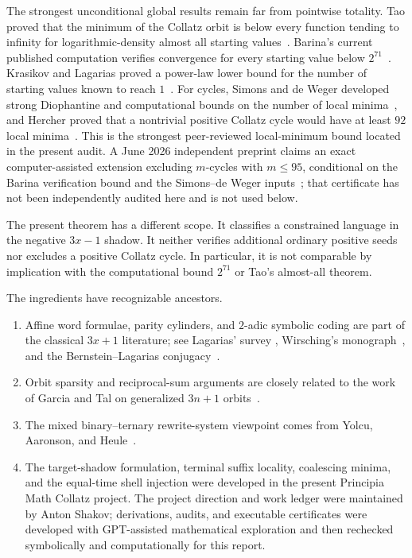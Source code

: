 \documentclass[11pt]{article}
\theoremstyle{definition}
\theoremstyle{remark}
\begin{document}
The strongest unconditional global results remain far from pointwise
totality.  Tao proved that the minimum of the Collatz orbit is below every
function tending to infinity for logarithmic-density almost all starting
values~\cite{Tao2022}.  Barina's current published computation verifies
convergence for every starting value below $2^{71}$~\cite{Barina2025}.
Krasikov and Lagarias proved a power-law lower bound for the number of
starting values known to reach $1$~\cite{KrasikovLagarias2003}.  For cycles,
Simons and de Weger developed strong Diophantine and computational bounds
on the number of local minima~\cite{SimonsDeWeger2005}, and Hercher proved
that a nontrivial positive Collatz cycle would have at least $92$ local
minima~\cite{Hercher2023}.  This is the strongest peer-reviewed local-minimum
bound located in the present audit.  A June 2026 independent preprint claims
an exact computer-assisted extension excluding $m$-cycles with $m\le95$,
conditional on the Barina verification bound and the Simons--de Weger
inputs~\cite{Wang2026}; that certificate has not been independently audited
here and is not used below.

The present theorem has a different scope.  It classifies a constrained
language in the negative $3x-1$ shadow.  It neither verifies additional
ordinary positive seeds nor excludes a positive Collatz cycle.  In
particular, it is not comparable by implication with the computational bound
$2^{71}$ or Tao's almost-all theorem.

The ingredients have recognizable ancestors.

\begin{enumerate}[label=\textup{(\roman*)}]
\item Affine word formulae, parity cylinders, and $2$-adic symbolic coding are
part of the classical $3x+1$ literature; see Lagarias' survey
\cite{Lagarias1985}, Wirsching's monograph~\cite{Wirsching1998}, and the
Bernstein--Lagarias conjugacy~\cite{BernsteinLagarias1996}.
\item Orbit sparsity and reciprocal-sum arguments are closely related to the
work of Garcia and Tal on generalized $3n+1$ orbits~\cite{GarciaTal1999}.
\item The mixed binary--ternary rewrite-system viewpoint comes from
Yolcu, Aaronson, and Heule~\cite{YolcuAaronsonHeule2023}.
\item The target-shadow formulation, terminal suffix locality, coalescing
minima, and the equal-time shell injection were developed in the present
Principia Math Collatz project.  The project direction and work ledger were
maintained by Anton Shakov; derivations, audits, and executable certificates
were developed with GPT-assisted mathematical exploration and then rechecked
symbolically and computationally for this report.
\end{enumerate}
\end{document}
